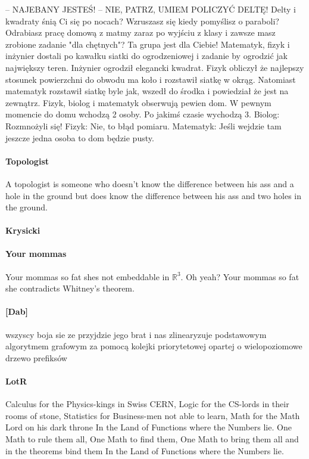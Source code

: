\begin{parnumbers}
-- NAJEBANY JESTEŚ! -- NIE, PATRZ, UMIEM POLICZYĆ DELTĘ!
Delty i kwadraty śnią Ci się po nocach? Wzruszasz się kiedy pomyślisz o paraboli? Odrabiasz pracę domową z matmy zaraz po wyjściu z klasy i zawsze masz zrobione zadanie "dla chętnych"? Ta grupa jest dla Ciebie!
Matematyk, fizyk i inżynier dostali po kawałku siatki do ogrodzeniowej i zadanie by ogrodzić jak największy teren. Inżynier ogrodził elegancki kwadrat. Fizyk obliczył że najlepszy stosunek powierzchni do obwodu ma koło i rozstawił siatkę w okrąg. Natomiast matematyk rozstawił siatkę byle jak, wszedł do środka i powiedział że jest na zewnątrz.
Fizyk, biolog i matematyk obserwują pewien dom. W pewnym momencie do domu wchodzą 2 osoby. Po jakimś czasie wychodzą 3. Biolog: Rozmnożyli się! Fizyk: Nie, to błąd pomiaru. Matematyk: Jeśli wejdzie tam jeszcze jedna osoba to dom będzie pusty.
\paragraph{Topologist} A topologist is someone who doesn't know the difference between his ass and a hole in the ground but does know the difference between his ass and two holes in the ground.
\paragraph{Krysicki} 

\paragraph{Your mommas} Your mommas so fat shes not embeddable in $\mathbb{R}^3$. Oh yeah? Your mommas so fat she contradicts Whitney's theorem.
\paragraph{[Dab]} wszyscy boja sie ze przyjdzie jego brat i nas zlinearyzuje podstawowym algorytmem grafowym za pomocą kolejki priorytetowej opartej o wielopoziomowe drzewo prefiksów

\paragraph{LotR}Calculus for the Physics-kings in Swiss CERN, Logic for the CS-lords in their rooms of stone, Statistics for Business-men not able to learn, Math for the Math Lord on his dark throne In the Land of Functions where the Numbers lie. One Math to rule them all, One Math to find them, One Math to bring them all and in the theorems bind them In the Land of Functions where the Numbers lie.


\end{parnumbers}
